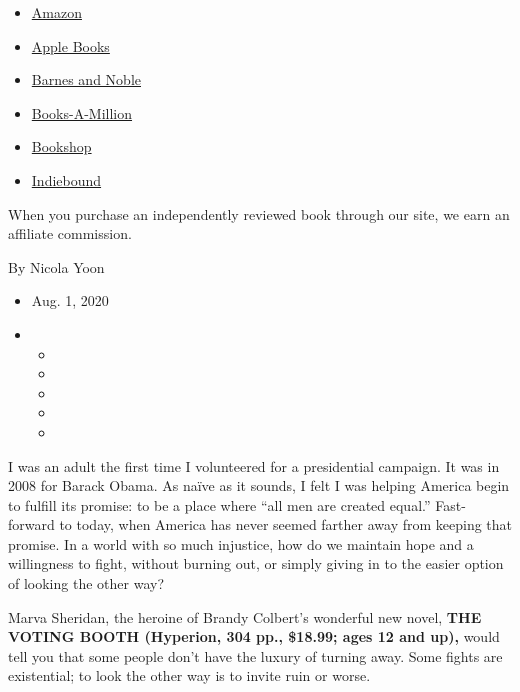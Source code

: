\begin{itemize}
\tightlist
\item
  \href{https://www.amazon.com/gp/search?index=books\&tag=NYTBSREV-20\&field-keywords=The+Voting+Booth+Brandy+Colbert}{Amazon}
\item
  \href{https://du-gae-books-dot-nyt-du-prd.appspot.com/buy?title=The+Voting+Booth\&author=Brandy+Colbert}{Apple
  Books}
\item
  \href{https://www.anrdoezrs.net/click-7990613-11819508?url=https\%3A\%2F\%2Fwww.barnesandnoble.com\%2Fw\%2F\%3Fean\%3D9781368053297}{Barnes
  and Noble}
\item
  \href{https://www.anrdoezrs.net/click-7990613-35140?url=https\%3A\%2F\%2Fwww.booksamillion.com\%2Fp\%2FThe\%2BVoting\%2BBooth\%2FBrandy\%2BColbert\%2F9781368053297}{Books-A-Million}
\item
  \href{https://bookshop.org/a/3546/9781368053297}{Bookshop}
\item
  \href{https://www.indiebound.org/book/9781368053297?aff=NYT}{Indiebound}
\end{itemize}

When you purchase an independently reviewed book through our site, we
earn an affiliate commission.

By Nicola Yoon

\begin{itemize}
\item
  Aug. 1, 2020
\item
  \begin{itemize}
  \item
  \item
  \item
  \item
  \item
  \end{itemize}
\end{itemize}

I was an adult the first time I volunteered for a presidential campaign.
It was in 2008 for Barack Obama. As naïve as it sounds, I felt I was
helping America begin to fulfill its promise: to be a place where ``all
men are created equal.'' Fast-forward to today, when America has never
seemed farther away from keeping that promise. In a world with so much
injustice, how do we maintain hope and a willingness to fight, without
burning out, or simply giving in to the easier option of looking the
other way?

Marva Sheridan, the heroine of Brandy Colbert's wonderful new novel,
\textbf{THE VOTING BOOTH (Hyperion, 304 pp., \$18.99; ages 12 and up),}
would tell you that some people don't have the luxury of turning away.
Some fights are existential; to look the other way is to invite ruin or
worse.

